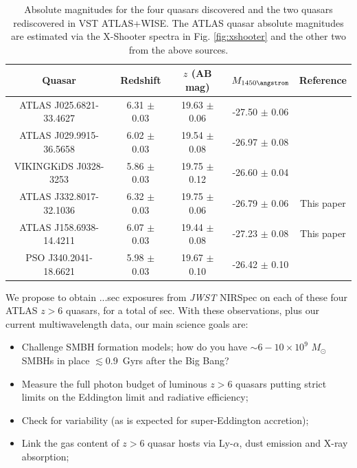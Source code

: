 \begin{table}
\begin{center}
\begin{tabular}{ccccc}
\hline
 Quasar            & Redshift  & $z$ (AB mag)     & $M_{1450 \angstrom} $ &  Reference\\
\hline
 ATLAS J025.6821-33.4627 & 6.31 $\pm$  0.03 & 19.63 $\pm$ 0.06 &  -27.50 $\pm$ 0.06& \cite{Carnall2015}\\
 ATLAS J029.9915-36.5658 & 6.02 $\pm$  0.03 & 19.54 $\pm$ 0.08 &  -26.97 $\pm$ 0.08& \cite{Carnall2015}\\
 VIKINGKiDS J0328-3253   & 5.86 $\pm$  0.03 & 19.75 $\pm$ 0.12 &  -26.60 $\pm$ 0.04& \cite{Venemans2015b}\\
 ATLAS J332.8017-32.1036 & 6.32 $\pm$  0.03 & 19.75 $\pm$ 0.06 &  -26.79 $\pm$ 0.06& This paper \\
 ATLAS J158.6938-14.4211 & 6.07 $\pm$  0.03 & 19.44 $\pm$ 0.08 &  -27.23 $\pm$ 0.08& This paper \\
 PSO J340.2041-18.6621   & 5.98 $\pm$  0.03 & 19.67 $\pm$ 0.10 &  -26.42 $\pm$ 0.10& \cite{Banados2014}\\
\hline
\end{tabular}
\end{center}
\caption{Absolute magnitudes for the  four quasars discovered and the two quasars rediscovered 
in VST ATLAS+WISE. The ATLAS quasar absolute magnitudes are estimated via the X-Shooter spectra in Fig. \ref{fig:xshooter}
and the other two from the above sources.}
\label{table:absmag}
\end{table}

\smallskip
\smallskip
\noindent
We propose to obtain ...sec exposures from {\it JWST} NIRSpec on each
of these four ATLAS $z>6$ quasars, for a total of sec.  With these
observations, plus our current multiwavelength data, our main science
goals are:
\begin{itemize}
\item Challenge SMBH formation models; how do you have $\sim$$6-10
  \times 10^{9}$ $M_{\odot}$ SMBHs in place $\lesssim$0.9~Gyrs after the
  Big Bang?
\item Measure the full photon budget of luminous $z>6$ quasars
  putting strict limits on the Eddington limit and radiative efficiency;
\item Check for variability (as is expected for super-Eddington accretion);
\item Link the gas content of $z>6$ quasar hosts via Ly-$\alpha$,
  dust emission and X-ray absorption;
\end{itemize}


